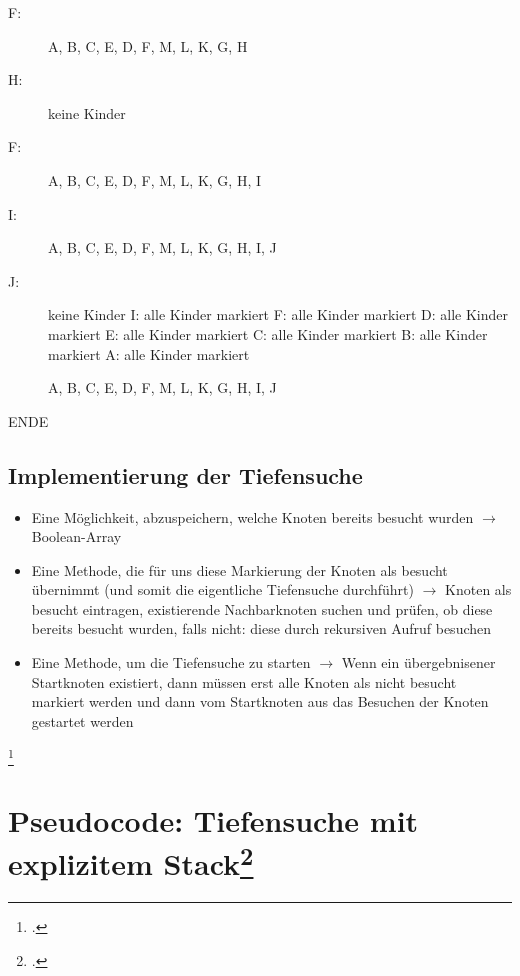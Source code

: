 \documentclass{lehramt-informatik-haupt}
\begin{document}
\begin{description}
\item[F:]
A, B, C, E, D, F, M, L, K, G, H

\item[H:] keine Kinder

\item[F:]
A, B, C, E, D, F, M, L, K, G, H, I

\item[I:]
A, B, C, E, D, F, M, L, K, G, H, I, J

\item[J:] keine Kinder
I: alle Kinder markiert
F: alle Kinder markiert
D: alle Kinder markiert
E: alle Kinder markiert
C: alle Kinder markiert
B: alle Kinder markiert
A: alle Kinder markiert

A, B, C, E, D, F, M, L, K, G, H, I, J

\end{description}

ENDE

\subsection{Implementierung der Tiefensuche}

\begin{itemize}
\item Eine Möglichkeit, abzuspeichern, welche Knoten bereits besucht
wurden $\rightarrow$ Boolean-Array

\item Eine Methode, die für uns diese Markierung der Knoten als besucht
übernimmt (und somit die eigentliche Tiefensuche durchführt)
$\rightarrow$  Knoten als besucht eintragen, existierende Nachbarknoten
suchen und prüfen, ob diese bereits besucht wurden, falls nicht: diese
durch rekursiven Aufruf besuchen

\item Eine Methode, um die Tiefensuche zu starten $\rightarrow$  Wenn
ein übergebnisener Startknoten existiert, dann müssen erst alle Knoten
als nicht besucht markiert werden und dann vom Startknoten aus das
Besuchen der Knoten gestartet werden
\end{itemize}
\footcite[Seite 45 (PDF 45)]{aud:fs:6}

\section{Pseudocode: Tiefensuche mit explizitem Stack\footcite[Seite 51 (PDF 45)]{aud:fs:6}}
\end{document}
